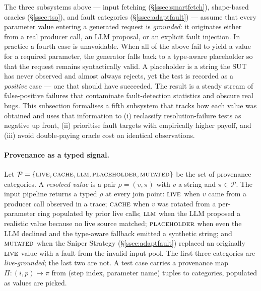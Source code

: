 \documentclass[conference]{IEEEtran}
\begin{document}
The three subsystems above --- input fetching (\S\ref{ssec:smartfetch}), shape-based oracles (\S\ref{ssec:tso}), and fault categories (\S\ref{ssec:adaptfault}) --- assume that every parameter value entering a generated request is \emph{grounded}: it originates either from a real producer call, an LLM proposal, or an explicit fault injection. In practice a fourth case is unavoidable. When all of the above fail to yield a value for a required parameter, the generator falls back to a type-aware placeholder so that the request remains syntactically valid. A placeholder is a string the SUT has never observed and almost always rejects, yet the test is recorded as a \emph{positive} case --- one that should have succeeded. The result is a steady stream of false-positive failures that contaminate fault-detection statistics and obscure real bugs. This subsection formalises a fifth subsystem that tracks how each value was obtained and uses that information to (i) reclassify resolution-failure tests as negative up front, (ii) prioritise fault targets with empirically higher payoff, and (iii) avoid double-paying oracle cost on identical observations.

\paragraph{Provenance as a typed signal.}
Let $\mathcal{P} = \{\textsc{live}, \textsc{cache}, \textsc{llm}, \textsc{placeholder}, \textsc{mutated}\}$ be the set of provenance categories. A \emph{resolved value} is a pair $\rho = (v, \pi)$ with $v$ a string and $\pi \in \mathcal{P}$. The input pipeline returns a typed $\rho$ at every join point: $\textsc{live}$ when $v$ came from a producer call observed in a trace; $\textsc{cache}$ when $v$ was rotated from a per-parameter ring populated by prior live calls; $\textsc{llm}$ when the LLM proposed a realistic value because no live source matched; $\textsc{placeholder}$ when even the LLM declined and the type-aware fallback emitted a synthetic string; and $\textsc{mutated}$ when the Sniper Strategy (\S\ref{ssec:adaptfault}) replaced an originally $\textsc{live}$ value with a fault from the invalid-input pool. The first three categories are \emph{live-grounded}; the last two are not. A test case carries a provenance map $\Pi: (i, p) \mapsto \pi$ from (step index, parameter name) tuples to categories, populated as values are picked.
\end{document}
